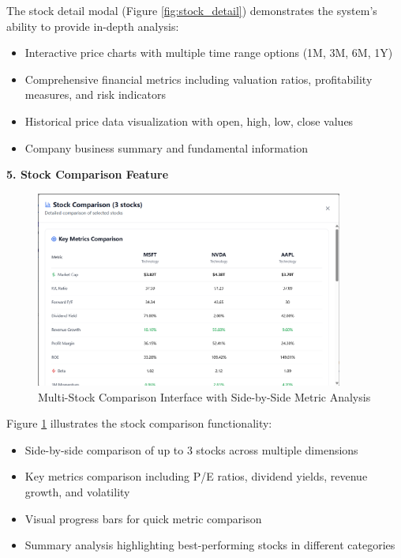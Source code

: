 The stock detail modal (Figure \ref{fig:stock_detail}) demonstrates the system's ability to provide in-depth analysis:
\begin{itemize}
\item Interactive price charts with multiple time range options (1M, 3M, 6M, 1Y)
\item Comprehensive financial metrics including valuation ratios, profitability measures, and risk indicators
\item Historical price data visualization with open, high, low, close values
\item Company business summary and fundamental information
\end{itemize}

\textbf{5. Stock Comparison Feature}

\begin{figure}[h]
\centering
\includegraphics[width=0.9\textwidth]{images/stock_recommend/compirasion.png}
\caption{Multi-Stock Comparison Interface with Side-by-Side Metric Analysis}
\label{fig:comparison}
\end{figure}

Figure \ref{fig:comparison} illustrates the stock comparison functionality:
\begin{itemize}
\item Side-by-side comparison of up to 3 stocks across multiple dimensions
\item Key metrics comparison including P/E ratios, dividend yields, revenue growth, and volatility
\item Visual progress bars for quick metric comparison
\item Summary analysis highlighting best-performing stocks in different categories
\end{itemize}

